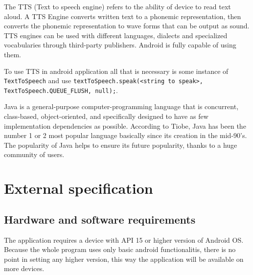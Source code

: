 \documentclass[a4paper,twoside,12pt]{book}
\begin{document}
\par The TTS (Text to speech engine) refers to the ability of device to read text aloud. A TTS Engine converts written text to a phonemic representation, then converts the phonemic representation to wave forms that can be output as sound. TTS engines can be used with different languages, dialects and specialized vocabularies through third-party publishers. Android is fully capable of using them\cite{bib:TTS}.
\par To use TTS in android application all that is necessary is some instance of \lstinline|TextToSpeech|  and use \lstinline|textToSpeech.speak(<string to speak>, TextToSpeech.QUEUE_FLUSH, null);|.

\par Java is a general-purpose computer-programming language that is concurrent, class-based, object-oriented, and specifically designed to have as few implementation dependencies as possible\cite{bib:Java2}. According to Tiobe, Java has been the number 1 or 2 most popular language basically since its creation in the mid-90’s. The popularity of Java helps to ensure its future popularity, thanks to a huge community of users\cite{bib:Java}.

\chapter{External specification}

\section{Hardware and software requirements}

\par The application requires a device with API 15 or higher version of  Android OS.
Because the whole program uses only basic android functionalitis, there is no point in setting any higher version, this way the application will be available on more devices\cite{bib:book}.
\end{document}
